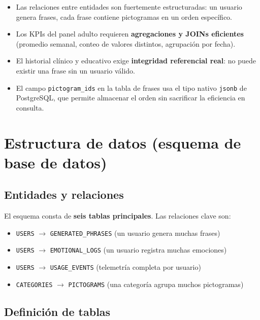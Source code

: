 \documentclass[12pt, a4paper]{article}
\begin{document}
\begin{itemize}
  \item Las relaciones entre entidades son fuertemente estructuradas: un usuario genera frases, cada frase contiene pictogramas en un orden específico.
  \item Los KPIs del panel adulto requieren \textbf{agregaciones y JOINs eficientes} (promedio semanal, conteo de valores distintos, agrupación por fecha).
  \item El historial clínico y educativo exige \textbf{integridad referencial real}: no puede existir una frase sin un usuario válido.
  \item El campo \texttt{pictogram\_ids} en la tabla de frases usa el tipo nativo \texttt{jsonb} de PostgreSQL, que permite almacenar el orden sin sacrificar la eficiencia en consulta.
\end{itemize}

\section{Estructura de datos (esquema de base de datos)}

\subsection{Entidades y relaciones}

El esquema consta de \textbf{seis tablas principales}. Las relaciones clave son:

\begin{itemize}
  \item \texttt{USERS} $\rightarrow$ \texttt{GENERATED\_PHRASES} (un usuario genera muchas frases)
  \item \texttt{USERS} $\rightarrow$ \texttt{EMOTIONAL\_LOGS} (un usuario registra muchas emociones)
  \item \texttt{USERS} $\rightarrow$ \texttt{USAGE\_EVENTS} (telemetría completa por usuario)
  \item \texttt{CATEGORIES} $\rightarrow$ \texttt{PICTOGRAMS} (una categoría agrupa muchos pictogramas)
\end{itemize}

\subsection{Definición de tablas}
\end{document}
